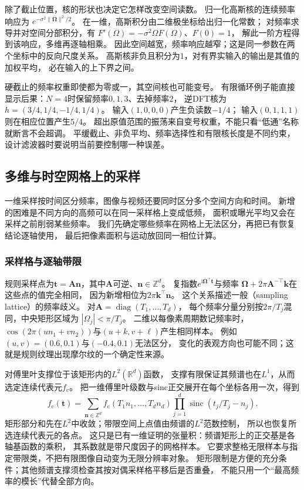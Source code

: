 除了截止位置，核的形状也决定它怎样改变空间读数。
归一化高斯核的连续频率响应为
$e^{-\sigma^2\|\bm\Omega\|^2/2}$。
在一维，高斯积分由二维极坐标给出归一化常数；
对频率求导并对空间分部积分，有
$F'(\Omega)=-\sigma^2\Omega F(\Omega)$、$F(0)=1$，
解此一阶方程得到该响应，多维再逐轴相乘。
因此空间越宽，频率响应越窄；这是同一参数在两个坐标中的反向尺度关系。
高斯核非负且积分为$1$，对有界实输入的输出是其值的加权平均，
必在输入的上下界之间。

硬截止的频率权重即使都为零或一，其空间核也可能变号。
有限循环例子能直接显示后果：$N=4$时保留频率$0,1,3$、去掉频率$2$，
逆DFT核为$h=(3/4,1/4,-1/4,1/4)$。
输入$(1,0,0,0)$产生负读数$-1/4$；
输入$(0,1,1,1)$则在相应位置产生$5/4$。
超出原值范围的振荡来自变号权重，不能只看“低通”名称就断言不会超调。
平缓截止、非负平均、频率选择性和有限核长度是不同约束，
设计滤波器时要说明当前要控制哪一种误差。

\subsection{多维与时空网格上的采样}
\label{sec:signal-multidimensional-sampling}

一维采样按时间区分频率，图像与视频还要同时区分多个空间方向和时间。
新增的困难是不同方向的高频可以在同一采样格上变成低频，
面积或曝光平均又会在采样之前削弱某些频率。
我们先确定哪些频率在网格上无法区分，再把已有恢复结论逐轴使用，
最后把像素面积与运动放回同一相位计算。

\subsubsection{采样格与逐轴带限}
规则采样点为$\bm t=\bm A\bm n$，其中$\bm A$可逆、$\bm n\in\mathbb Z^d$。
复指数$e^{\mathrm i\bm\Omega^\top\bm t}$与频率
$\bm\Omega+2\pi\bm A^{-\top}\bm k$在这些点的值完全相同，
因为新增相位为$2\pi\bm k^\top\bm n$。
这个关系描述一般（sampling lattice）的频率歧义。
对$\bm A=\operatorname{diag}(T_1,\ldots,T_d)$，
每个频率分量分别按$2\pi/T_j$混同，中央矩形区域为
$|\Omega_j|<\pi/T_j$。
二维以每像素周期数记频率时，
$\cos(2\pi(un_1+vn_2))$与$(u+k,v+\ell)$产生相同样本。
例如$(u,v)=(0.6,0.1)$与$(-0.4,0.1)$无法区分，
变化的表观方向也可能不同；这就是规则纹理出现摩尔纹的一个确定性来源。

对傅里叶支撑位于该矩形内的$L^2(\mathbb R^d)$函数，
支撑有限保证其频谱也在$L^1$，从而选定连续代表元$f_{\mathrm c}$。
把一维傅里叶级数与sinc正交展开在每个坐标各用一次，得到
\begin{equation}
 f_{\mathrm c}(\bm t)=
 \sum_{\bm n\in\mathbb Z^d}
 f_{\mathrm c}(T_1n_1,\ldots,T_dn_d)
 \prod_{j=1}^d\operatorname{sinc}(t_j/T_j-n_j).
 \label{eq:signal-multidimensional-sinc}
\end{equation}
矩形部分和先在$L^2$中收敛；带限空间上点值由频谱的$L^2$范数控制，
所以也恢复所选连续代表元的各点。
这只是已有一维证明的张量积：频谱矩形上的正交基是各轴基函数的乘积，
其系数就是带尺度因子的网格样本。
它要求整格无限样本与指定带限类，不把有限图像自动变为无限分辨率对象。
矩形限制是方便的充分条件；其他频谱支撑须检查其按对偶采样格平移后是否重叠，
不能只用一个“最高频率的模长”代替全部方向。

